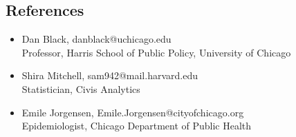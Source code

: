 \documentclass[margin,line]{resume}
\begin{document}
\begin{resume}
	\section{\mysidestyle References}
		\begin{itemize}

        \item Dan Black, danblack@uchicago.edu \\
                Professor, Harris School of Public Policy, University of Chicago
        \item Shira Mitchell, sam942@mail.harvard.edu \\
                Statistician, Civis Analytics
	\item Emile Jorgensen, Emile.Jorgensen@cityofchicago.org \\
		Epidemiologist, Chicago Department of Public Health
		\end{itemize}
\end{resume}
\end{document}
